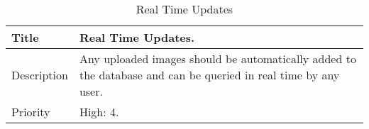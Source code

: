   \begin{table}[h!]
    \caption{Real Time Updates}
    \label{system-requirements/non-functional/real-time-updates}
    \begin{tabularx}{\textwidth}{|l|X|}
      \hline
      Title           & Real Time Updates. \\ \hline
      Description     & Any uploaded images should be automatically added to
			 the database and can be queried in real time by any user.\\ \hline
      Priority        & High: 4. \\ \hline
    \end{tabularx}
  \end{table}